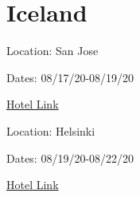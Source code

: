 \documentclass{article}
\begin{document}
\section{Iceland}\noindent Location: San Jose

\noindent Dates: 08/17/20-08/19/20

\href{http://www.hotels.com/search.do?San%20Jose&q-destination=San%20Jose&q-check-in=2020-08-17&q-check-out=2020-08-19&q-rooms=1&q-room-0-adults=4&q-room-0-children=0&sort-order=DISTANCE_FROM_LANDMARK}{Hotel Link}

\noindent Location: Helsinki

\noindent Dates: 08/19/20-08/22/20

\href{http://www.hotels.com/search.do?Helsinki&q-destination=Helsinki&q-check-in=2020-08-19&q-check-out=2020-08-22&q-rooms=1&q-room-0-adults=4&q-room-0-children=0&sort-order=DISTANCE_FROM_LANDMARK}{Hotel Link}
\end{document}
